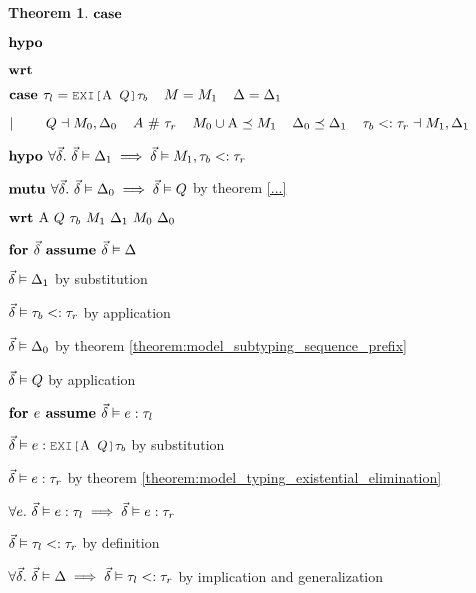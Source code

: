 \documentclass[acmsmall]{acmart}
\theoremstyle{definition}
\newtheorem{theorem}{Theorem}[section]
\begin{document}
\begin{theorem}
    \item \Z $\textbf{case } $
    \item \Z $\textbf{hypo } $
    \item \Z $\textbf{wrt } $
      \item \Z\Z {} 

    \item \Z $\B{case } 
      \tau_l = \J{EXI[$\Alpha$ $Q$]$\tau_b$}
      \I
      M = M_1
      \I
      \Delta = \Delta_1
    $
    \item \Z $|\ \ \ \ \ \ \ 
      Q \dashv M_0, \Delta_0
      \hspace{4mm}
      A \ \#\  \tau_r
      \hspace{4mm}
      M_0 \cup \mathrm{A} \preceq M_1
      \hspace{4mm}
      \Delta_0 \preceq \Delta_1
      \hspace{4mm}
      \tau_b <: \tau_r
      \dashv M_1, \Delta_1
    $
    \item \Z $\textbf{hypo } 
      \forall \vec{\delta} .\ \vec{\delta} \vDash \Delta_1 \implies \vec{\delta} \vDash M_1, \tau_b <: \tau_r 
    $
    \item \Z $\textbf{mutu } 
      \forall \vec{\delta} .\ \vec{\delta} \vDash \Delta_0 \implies \vec{\delta} \vDash Q 
    $ by theorem \ref{...} 
    \item \Z $\B{wrt } \Alpha\ Q\ \tau_b\ M_1\ \Delta_1\ M_0\ \Delta_0$
      \item \Z\Z $\textbf{for } \vec{\delta} \textbf{ assume } \vec{\delta} \vDash \Delta$
        \item \Z\Z\Z $\vec{\delta} \vDash \Delta_1 $ by substitution
        \item \Z\Z\Z $\vec{\delta} \vDash \tau_b <: \tau_r$ by application
        \item \Z\Z\Z $\vec{\delta} \vDash \Delta_0 $ by theorem \ref{theorem:model_subtyping_sequence_prefix}
        \item \Z\Z\Z $\vec{\delta} \vDash Q$ by application
        \item \Z\Z\Z $\textbf{for } e \textbf{ assume } \vec{\delta} \vDash e : \tau_l$ 
          \item \Z\Z\Z\Z $\vec{\delta} \satisfies e \hastype \J{EXI[$\Alpha$ $Q$]$\tau_b$}$ by substitution
          \item \Z\Z\Z\Z $\vec{\delta} \vDash e : \tau_r$ by theorem \ref{theorem:model_typing_existential_elimination} 
        \item \Z\Z\Z $\forall e .\ \vec{\delta} \vDash e : \tau_l 
          \implies \vec{\delta} \vDash e : \tau_r
        $ 
        \item \Z\Z\Z $\vec{\delta} \vDash \tau_l <: \tau_r$ by definition 
      \item \Z\Z $\forall \vec{\delta} .\ \vec{\delta} \vDash \Delta \implies \vec{\delta} \vDash \tau_l <: \tau_r$ 
      by implication and generalization


\end{theorem}
\end{document}
